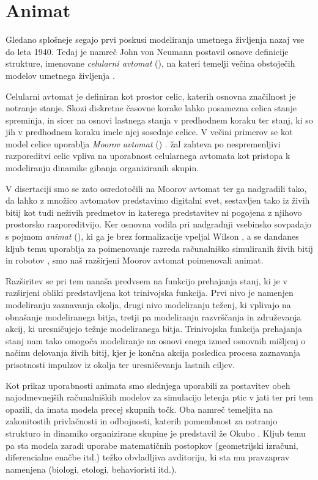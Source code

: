 \section{Animat}
Gledano splošneje segajo prvi poskusi modeliranja umetnega življenja nazaj vse do leta 1940. Tedaj je namreč John von Neumann postavil osnove definicije strukture, imenovane \emph{celularni avtomat} (), na kateri temelji večina obstoječih modelov umetnega življenja \cite{adami:1998,bonabeau:1999,emmenche:1994,gardner:1970,langton:1984,rucker:1993}. 

Celularni avtomat je definiran kot prostor celic, katerih osnovna značilnost je notranje stanje. Skozi diskretne časovne korake lahko posamezna celica stanje spreminja, in sicer na osnovi lastnega stanja v predhodnem koraku ter stanj, ki so jih v predhodnem koraku imele njej sosednje celice. V večini primerov se kot model celice uporablja \emph{Moorov avtomat} () \cite{mraz:2000}. žal zahteva po nespremenljivi razporeditvi celic vpliva na uporabnost celularnega avtomata kot pristopa k modeliranju dinamike gibanja organiziranih skupin. 

V disertaciji smo se zato osredotočili na Moorov avtomat ter ga nadgradili tako, da lahko z množico avtomatov predstavimo digitalni svet, sestavljen tako iz živih bitij kot tudi neživih predmetov in katerega predstavitev ni pogojena z njihovo prostorsko razporeditvijo. Ker osnovna vodila pri nadgradnji vsebinsko sovpadajo s pojmom \emph{animat} (), ki ga je brez formalizacije vpeljal Wilson \cite{wilson:1985}, a se dandanes kljub temu uporablja za poimenovanje razreda računalniško simuliranih živih bitij in robotov \cite{cliff:1993,watts:1998}, smo naš razširjeni Moorov avtomat poimenovali animat. 

Razširitev se pri tem nanaša predvsem na funkcijo prehajanja stanj, ki je v razširjeni obliki predstavljena kot trinivojska funkcija. Prvi nivo je namenjen modeliranju zaznavanja okolja, drugi nivo modeliranju teženj, ki vplivajo na obnašanje modeliranega bitja, tretji pa modeliranju razvrščanja in združevanja akcij, ki uresničujejo težnje modeliranega bitja. Trinivojska funkcija prehajanja stanj nam tako omogoča modeliranje na osnovi enega izmed osnovnih mišljenj o načinu delovanja živih bitij, kjer je končna akcija posledica procesa zaznavanja prisotnosti impulzov iz okolja ter uresničevanja lastnih ciljev.

Kot prikaz uporabnosti animata smo slednjega uporabili za postavitev obeh najodmevnejših računalniških modelov za simulacijo letenja ptic v jati ter pri tem opazili, da imata modela precej skupnih točk. Oba namreč temeljita na zakonitostih privlačnosti in odbojnosti, katerih pomembnost za notranjo strukturo in dinamiko organizirane skupine je predstavil že Okubo \cite{okubo:1980}. Kljub temu pa sta modela zaradi uporabe matematičnih postopkov (geometrijski izračuni, diferencialne enačbe itd.) težko obvladljiva avditoriju, ki sta mu pravzaprav namenjena (biologi, etologi, behavioristi itd.).

